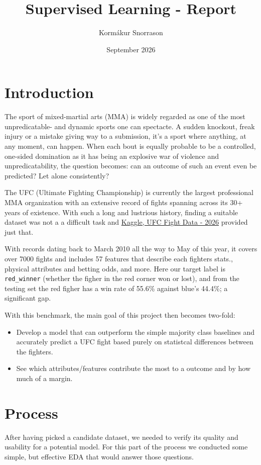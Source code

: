 \documentclass[11pt]{article}
\title{Supervised Learning - Report}
\author{Kormákur Snorrason}
\date{September 2026}
\begin{document}
\maketitle

\section{Introduction}

The sport of mixed-martial arts (MMA) is widely regarded as one of the most unpredicatable- and dynamic sports one can spectacte. A sudden knockout, freak injury or a mistake giving way to a submission, 
it's a sport where anything, at any moment, can happen. When each bout is equally probable to be a controlled, one-sided domination as it has being an explosive war of violence and unpredicatability,
the question becomes: can an outcome of such an event even be predicted? Let alone consistently? \par

The UFC (Ultimate Fighting Championship) is currently the largest professional MMA organization with an extensive record of fights spanning across its 30+ years of existence. With such a 
long and lustrious history, finding a suitable dataset was not a a difficult task and \href{https://www.kaggle.com/datasets/anthonysz/ufc-fight-data-2026/data}{Kaggle, UFC Fight Data - 2026} 
provided just that.\par

With records dating back to March 2010 all the way to May of this year, it covers over 7000 fights and includes 57 features that describe each fighters stats., physical attributes and betting odds, and more.
Here our target label is \verb|red_winner| (whether the figher in the red corner won or lost), and from the testing set the red figher has a win rate of 55.6\% against blue's 44.4\%; a significant gap.\par

With this benchmark, the main goal of this project then becomes two-fold:  
\begin{itemize}
    \item Develop a model that can outperform the simple majority class baselines and accurately predict a UFC fight based purely on statistcal differences between the fighters.
    \item See which attributes/features contribute the most to a outcome and by how much of a margin.
\end{itemize}

\section{Process}
After having picked a candidate dataset, we needed to verify its quality and usability for a potential model. For this part of the process we conducted some simple, but effective EDA that would answer 
those questions.\par 
\end{document}
